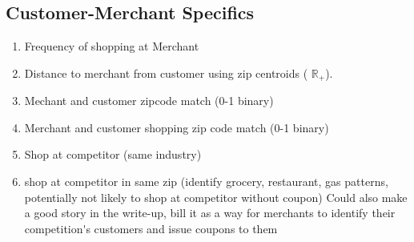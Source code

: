 \documentclass{article}
\begin{document}
\subsection{Customer-Merchant Specifics}
\begin{enumerate}
\item Frequency of shopping at Merchant
\item Distance to merchant  from customer using zip centroids ( $\mathbb{R}_+$).
\item Mechant and customer zipcode match (0-1 binary)
\item Merchant and customer shopping zip code match (0-1 binary)
\item Shop at competitor (same industry)
\item shop at competitor in same zip (identify grocery, restaurant, gas patterns, potentially not likely to shop at competitor without coupon) \ac{Could also make a good story in the write-up, bill it as a way for merchants to identify their competition's customers and issue coupons to them}
\end{enumerate}
\end{document}
